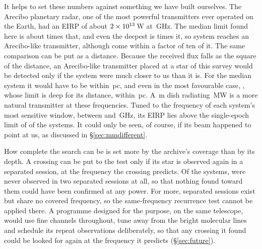 It helps to set these numbers against something we have built ourselves.
The Arecibo planetary radar, one of the most powerful transmitters ever
operated on the Earth, had an EIRP of about $2\times10^{13}$\,W at
\AroFreqGHz\,GHz. The median limit found here is about \AroMedMult{} times
that, and even the deepest is \AroDeepMult{} times it, so
\AroNSysBelowWord{} system reaches an Arecibo-like transmitter, although
\AroNSysTen{} come within a factor of ten of it. The same comparison can be
put as a distance. Because the received flux falls as the square of the
distance, an Arecibo-like transmitter placed at a star of this survey would
be detected only if the system were much closer to us than it is. For the
median system it would have to be within \AroDistMedPc\,pc, and even in the
most favourable case, \AroDistMaxStar, whose limit is deep for its distance,
within \AroDistMaxPc\,pc. A \BenchDiam\,m dish radiating \BenchPowerMW\,MW is
a more natural transmitter at these frequencies. Tuned to the frequency of
each system's most sensitive window, between \BenchTunedFreqLo{} and
\BenchTunedFreqHi\,GHz, its EIRP lies above the single-epoch limit of
\BenchNSysTuned{} of the \NSysALimSum{} systems. It could only be seen, of
course, if its beam happened to point at us, as discussed in
\S\ref{sec:mmdifferent}.

How complete the search can be is set more by the archive's coverage than by
its depth. A crossing can be put to the test only if its star is observed
again in a separated session, at the frequency the crossing predicts. Of the \NSysClassA{} systems,
\ZcNoRepNoSep{} were never observed in two separated sessions at all, so that
nothing found toward them could have been confirmed at any power. For
\ZcNoRepNoFreqWord{} more, separated sessions exist but share no covered
frequency, so the same-frequency recurrence test cannot be applied there. A
programme designed for the purpose, on the same telescope, would use fine
channels throughout, tune away from the bright molecular lines and schedule its repeat observations deliberately, so that
any crossing it found could be looked for again at the frequency it predicts
(\S\ref{sec:future}).
